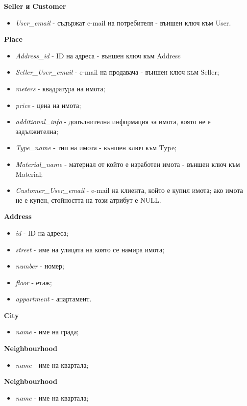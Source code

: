 \documentclass[a4paper,12pt, leqno]{article}
\begin{document}
\textbf{Seller и Customer}
\begin{itemize}
 \item \textit{User\_email} - съдържат e-mail на потребителя - външен ключ към User.
\end{itemize}

\textbf{Place}
\begin{itemize}
 \item \textit{Address\_id} - ID на адреса - външен ключ към Address
 \item \textit{Seller\_User\_email} - e-mail на продавача - външен ключ към Seller;
 \item \textit{meters} - квадратура на имота;
 \item \textit{price} - цена на имота;
 \item \textit{additional\_info} - допълнителна информация за имота, която не е задължителна;
 \item \textit{Type\_name} - тип на имота - външен ключ към Type;
 \item \textit{Material\_name} - материал от който е изработен имота - външен ключ към Material;
 \item \textit{Customer\_User\_email} - e-mail на клиента, който е купил имота; ако имота не е купен, стойността на този 
атрибут е NULL.
\end{itemize}

\textbf{Address}
\begin{itemize}
 \item \textit{id} - ID на адреса;
 \item \textit{street} - име на улицата на която се намира имота;
 \item \textit{number} - номер;
 \item \textit{floor} - етаж;
 \item \textit{appartment} - апартамент.
\end{itemize}

\textbf{City}
\begin{itemize}
 \item \textit{name} - име на града;
\end{itemize}

\textbf{Neighbourhood}
\begin{itemize}
 \item \textit{name} - име на квартала;
\end{itemize}

\textbf{Neighbourhood}
\begin{itemize}
 \item \textit{name} - име на квартала;
\end{itemize}
\end{document}
